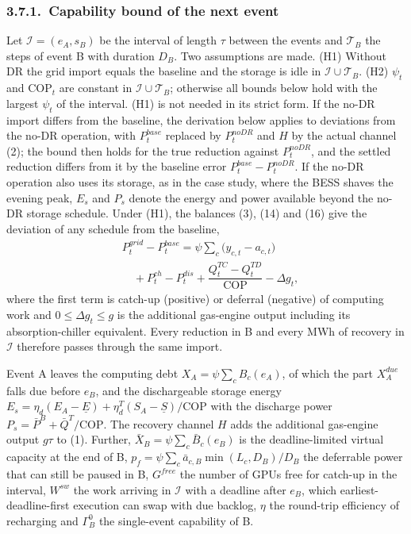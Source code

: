 \documentclass[a4paper,twocolumn,fleqn,10pt]{article}
\begin{document}
\subsubsection*{3.7.1.~Capability bound of the next event}

Let \(\mathcal I=(e_A,s_B)\) be the interval of length \(\tau\) between the events and \(\mathcal T_B\) the steps of event B with duration \(D_B\). Two assumptions are made. (H1) Without DR the grid import equals the baseline and the storage is idle in \(\mathcal I\cup\mathcal T_B\). (H2) \(\psi_t\) and \(\mathrm{COP}_t\) are constant in \(\mathcal I\cup\mathcal T_B\); otherwise all bounds below hold with the largest \(\psi_t\) of the interval. (H1) is not needed in its strict form. If the no-DR import differs from the baseline, the derivation below applies to deviations from the no-DR operation, with \(P^{base}_t\) replaced by \(P^{noDR}_t\) and \(H\) by the actual channel (2); the bound then holds for the true reduction against \(P^{noDR}_t\), and the settled reduction differs from it by the baseline error \(P^{base}_t-P^{noDR}_t\). If the no-DR operation also uses its storage, as in the case study, where the BESS shaves the evening peak, \(E_s\) and \(P_s\) denote the energy and power available beyond the no-DR storage schedule. Under (H1), the balances (3), (14) and (16) give the deviation of any schedule from the baseline, \[\begin{aligned}&P^{grid}_t-P^{base}_t=\psi\textstyle\sum_c\big(y_{c,t}-a_{c,t}\big)\\&\quad+P^{ch}_t-P^{dis}_t+\dfrac{Q^{TC}_t-Q^{TD}_t}{\mathrm{COP}}-\Delta g_t,\end{aligned} \tag{37}\] where the first term is catch-up (positive) or deferral (negative) of computing work and \(0\le\Delta g_t\le g\) is the additional gas-engine output including its absorption-chiller equivalent. Every reduction in B and every MWh of recovery in \(\mathcal I\) therefore passes through the same import.

Event A leaves the computing debt \(X_A=\psi\sum_cB_c(e_A)\), of which the part \(X^{due}_A\) falls due before \(e_B\), and the dischargeable storage energy \(E_s=\eta_d(E_A-\underline E)+\eta^T_d(S_A-\underline S)/\mathrm{COP}\) with the discharge power \(P_s=\bar P^{B}+\bar Q^{T}/\mathrm{COP}\). The recovery channel \(H\) adds the additional gas-engine output \(g\tau\) to (1). Further, \(\bar X_B=\psi\sum_c\bar B_c(e_B)\) is the deadline-limited virtual capacity at the end of B, \(p_f=\psi\sum_c\bar a_{c,B}\min(L_c,D_B)/D_B\) the deferrable power that can still be paused in B, \(G^{free}\) the number of GPUs free for catch-up in the interval, \(W^{sw}\) the work arriving in \(\mathcal I\) with a deadline after \(e_B\), which earliest-deadline-first execution can swap with due backlog, \(\eta\) the round-trip efficiency of recharging and \(\Gamma^0_B\) the single-event capability of B.
\end{document}
